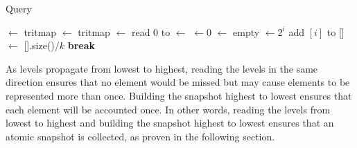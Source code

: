  
\begin{algorithm}[h]
\caption{Query} \label{alg:sl_query}
\begin{algorithmic}
\setcounter{ALG@line}{\value{mycounter}}
    \State {} $\gets$ tritmap \label{Line:read_current_stream}
     \label{Line:check_rho}
        \State {} \label{Line:query_from_cache}
    \EndIf
    \Repeat \label{Line:start_collect_levels}
        \State {} $\gets$ tritmap
        \State {} $\gets$ read  $0$ to  \label{Line: read_snap}
        \State {} $\gets$  \label{Line: second-collect}
      \label{Line:query_linearization}
    \State {} $\gets 0$ \label{line: query_estimate_start}
    \State {} $\gets$ empty 
     \label{Line:start_collect_snapshot}
        \State {} $\gets 2^i $
         \label{Line:add_to_snapshot}
            \State add $[i]$ to  \label{Line:add_level_to_snapshot}
            \State {}[] $\gets$ [].size()$ / k$  \label{Line:update_myTrit} \label{line: query_estimate_end}
             \label{Line:snapshot_done}
                \State \textbf{break}
            \EndIf
        \EndIf
    \EndFor
    \State {} \label{Line:query_result}
\EndProcedure
\setcounter{mycounter}{\value{ALG@line}}
\end{algorithmic}
\end{algorithm}


As levels propagate from lowest to highest, reading the levels in the same direction ensures that no element would be missed but may cause elements to be represented more than once. Building the snapshot highest to lowest ensures that each element will be accounted once. 
In other words, reading the levels from lowest to highest and building the snapshot highest to lowest ensures that an atomic snapshot is collected, as proven in the following section. 



